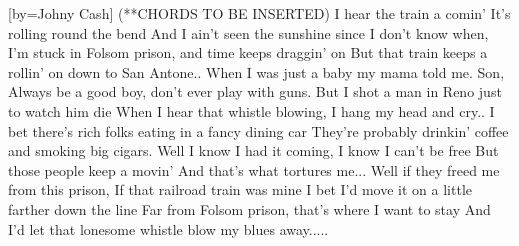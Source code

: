 [by={Johny Cash}]
\beginverse (**CHORDS TO BE INSERTED)
I hear the train a comin'
It's rolling round the bend
And I ain't seen the sunshine since I don't know when,
I'm stuck in Folsom prison, and time keeps draggin' on
But that train keeps a rollin' on down to San Antone..
When I was just a baby my mama told me. Son,
Always be a good boy, don't ever play with guns.
But I shot a man in Reno just to watch him die
When I hear that whistle blowing, I hang my head and cry..
\endverse
\beginverse
I bet there's rich folks eating in a fancy dining car
They're probably drinkin' coffee and smoking big cigars.
Well I know I had it coming, I know I can't be free
But those people keep a movin'
And that's what tortures me...
\endverse
\beginverse
Well if they freed me from this prison,
If that railroad train was mine
I bet I'd move it on a little farther down the line
Far from Folsom prison, that's where I want to stay
And I'd let that lonesome whistle blow my blues away..... 
\endverse
\endsong